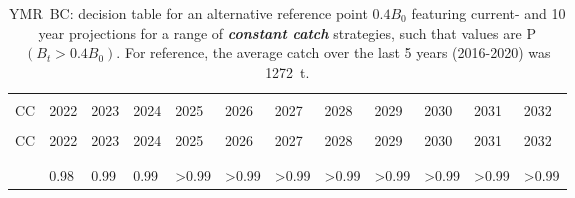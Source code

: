 \documentclass[11pt]{book}
\newcommand{\itbf}[1]{\textit{\textbf{#1}}}
\begin{document}
\begin{longtable}[c]{>{\raggedright\let\newline\\\arraybackslash\hspace{0pt}}p{0.5in}>{\raggedleft\let\newline\\\arraybackslash\hspace{0pt}}p{0.5in}>{\raggedleft\let\newline\\\arraybackslash\hspace{0pt}}p{0.5in}>{\raggedleft\let\newline\\\arraybackslash\hspace{0pt}}p{0.5in}>{\raggedleft\let\newline\\\arraybackslash\hspace{0pt}}p{0.53in}>{\raggedleft\let\newline\\\arraybackslash\hspace{0pt}}p{0.53in}>{\raggedleft\let\newline\\\arraybackslash\hspace{0pt}}p{0.53in}>{\raggedleft\let\newline\\\arraybackslash\hspace{0pt}}p{0.53in}>{\raggedleft\let\newline\\\arraybackslash\hspace{0pt}}p{0.53in}>{\raggedleft\let\newline\\\arraybackslash\hspace{0pt}}p{0.53in}>{\raggedleft\let\newline\\\arraybackslash\hspace{0pt}}p{0.53in}>{\raggedleft\let\newline\\\arraybackslash\hspace{0pt}}p{0.53in}}
  \caption{YMR~BC: decision table for an alternative reference point $0.4 B_0$ featuring current- and 10 year projections for a range of \itbf{constant catch} strategies, such that values are P$(B_t > 0.4 B_0)$.  For reference, the average catch over the last 5 years (2016-2020) was 1272~t. } \label{tab:ymr.gmu.40B0.CCs}\\  \hline\\[-2.2ex]  CC  & 2022 & 2023 & 2024 & 2025 & 2026 & 2027 & 2028 & 2029 & 2030 & 2031 & 2032 \\[0.2ex]\hline\\[-1.5ex]  \endfirsthead   \hline  CC  & 2022 & 2023 & 2024 & 2025 & 2026 & 2027 & 2028 & 2029 & 2030 & 2031 & 2032 \\[0.2ex]\hline\\[-1.5ex]  \endhead  \hline\\[-2.2ex]   \endfoot  \hline \endlastfoot  0 & 0.98 & 0.99 & 0.99 & >0.99 & >0.99 & >0.99 & >0.99 & >0.99 & >0.99 & >0.99 & >0.99 \\ 

\end{longtable}
\end{document}
